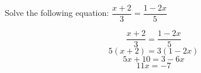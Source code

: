 \question Solve the following equation: 
$\dfrac{x+2}{3} = \dfrac{1-2x}{5}$
\begin{solution}
	\[
		\dfrac{x+2}{3} = \dfrac{1-2x}{5}
	\]
	\[
		5(x+2) = 3(1-2x)
	\]
	\[
		5x + 10 = 3 - 6x
	\]
	\[
		11x = -7
	\]
\end{solution}

